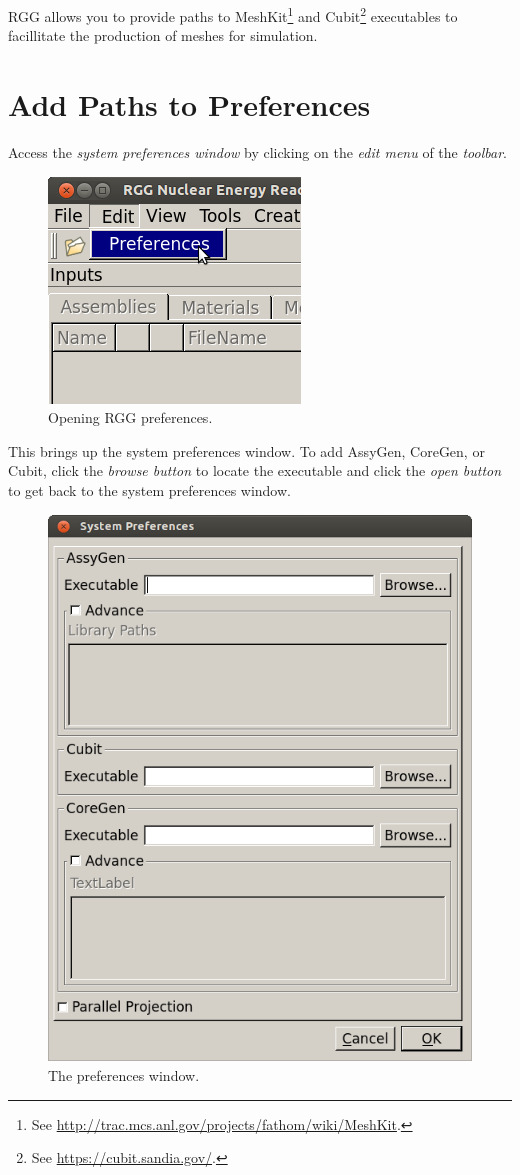 RGG allows you to provide paths to MeshKit\footnote{See \url{http://trac.mcs.anl.gov/projects/fathom/wiki/MeshKit}.} and Cubit\footnote{See \url{https://cubit.sandia.gov/}.} executables to facillitate the production of meshes for simulation.

\section{Add Paths to Preferences}

Access the \emph{system preferences window} by clicking on the \emph{edit menu} of the \emph{toolbar}.

\begin{figure}[H]
	\begin{center}
		\includegraphics[width=0.5\linewidth]{Images/mesh-1.png}
		\caption{Opening RGG preferences.}
		\label{fig:Mesh1}
	\end{center}
\end{figure}

This brings up the system preferences window.  To add AssyGen, CoreGen, or Cubit, click the \emph{browse button} to locate the executable and click the \emph{open button} to get back to the system preferences window.

\begin{figure}[H]
	\begin{center}
		\includegraphics[width=0.5\linewidth]{Images/mesh-2.png}
		\caption{The preferences window.}
		\label{fig:Mesh2}
	\end{center}
\end{figure}